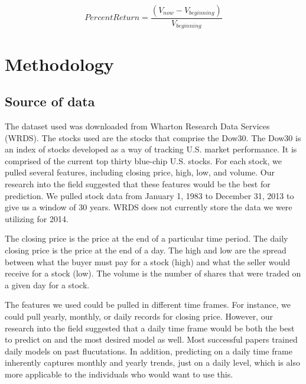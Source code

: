 \documentclass{article}
\begin{document}
$$
Percent Return = \frac{(V_{now} - V_{beginning})}{V_{beginning}}
$$

\section{Methodology}

\subsection{Source of data}
The dataset used was downloaded from Wharton Research Data Services (WRDS). The stocks used are the stocks that comprise the Dow30. The Dow30 is an index of stocks developed as a way of tracking U.S. market performance. It is comprised of the current top thirty blue-chip U.S. stocks. For each stock, we pulled several features, including closing price, high, low, and volume. Our research into the field suggested that these features would be the best for prediction. We pulled stock data from January 1, 1983 to December 31, 2013 to give us a window of 30 years. WRDS does not currently store the data we were utilizing for 2014.

The closing price is the price at the end of a particular time period. The daily closing price is the price at the end of a day. The high and low are the spread between what the buyer must pay for a stock (high) and what the seller would receive for a stock (low). The volume is the number of shares that were traded on a given day for a stock.

The features we used could be pulled in different time frames. For instance, we could pull yearly, monthly, or daily records for closing price. However, our research into the field suggested that a daily time frame would be both the best to predict on and the most desired model as well. Most successful papers trained daily models on past flucutations. In addition, predicting on a daily time frame inherently captures monthly and yearly trends, just on a daily level, which is also more applicable to the individuals who would want to use this.
\end{document}
